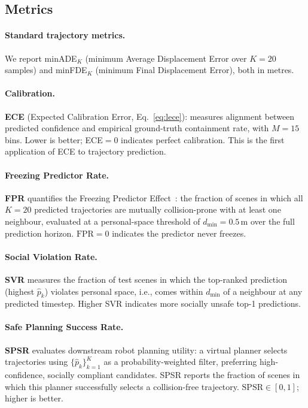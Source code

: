 \documentclass{article}
\begin{document}
\subsection{Metrics}
\label{sec:exp:metrics}

\paragraph{Standard trajectory metrics.}
We report minADE\(_K\) (minimum Average Displacement Error over \(K=20\)
samples) and minFDE\(_K\) (minimum Final Displacement Error), both in metres.

\paragraph{Calibration.}
\textbf{ECE} (Expected Calibration Error, Eq.~\eqref{eq:lece}): measures
alignment between predicted confidence and empirical ground-truth containment
rate, with \(M=15\) bins. Lower is better; ECE\(=0\) indicates perfect
calibration. This is the first application of ECE to trajectory prediction.

\paragraph{Freezing Predictor Rate.}
\textbf{FPR} quantifies the Freezing Predictor
Effect~\cite{trautman2010unfreezing}: the fraction of scenes in which all
\(K=20\) predicted trajectories are mutually collision-prone with at least one
neighbour, evaluated at a personal-space threshold of
\(d_{\min} = 0.5\)\,m over the full prediction horizon.
\(\text{FPR} = 0\) indicates the predictor never freezes.

\paragraph{Social Violation Rate.}
\textbf{SVR} measures the fraction of test scenes in which the top-ranked
prediction (highest \(\hat{p}_k\)) violates personal space, i.e., comes within
\(d_{\min}\) of a neighbour at any predicted timestep. Higher SVR indicates
more socially unsafe top-1 predictions.

\paragraph{Safe Planning Success Rate.}
\textbf{SPSR} evaluates downstream robot planning utility: a virtual planner
selects trajectories using \(\{\hat{p}_k\}_{k=1}^{K}\) as a
probability-weighted filter, preferring high-confidence, socially compliant
candidates. SPSR reports the fraction of scenes in which this planner
successfully selects a collision-free trajectory.
\(\text{SPSR} \in [0,1]\); higher is better.
\end{document}
